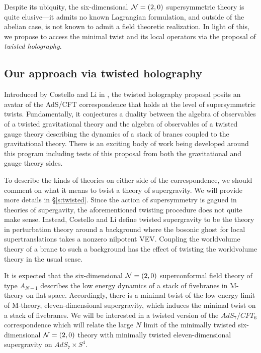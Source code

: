 Despite its ubiquity, the six-dimensional~$\mathcal N=(2,0)$ supersymmetric theory is quite elusive---it admits no known Lagrangian formulation, and outside of the abelian case, is not known to admit a field theoretic realization.
In light of this, we propose to access the minimal twist and its local operators via the proposal of \textit{twisted holography}.

\subsection{Our approach via twisted holography}
Introduced by Costello and Li in \cite{CLsugra}, the twisted holography proposal posits an avatar of the AdS/CFT correspondence that holds at the level of supersymmetric twists.
Fundamentally, it conjectures a duality between the algebra of observables of a twisted gravitational theory and the algebra of observables of a twisted gauge theory describing the dynamics of a stack of branes coupled to the gravitational theory. There is an exciting body of work being developed around this program including tests of this proposal from both the gravitational and gauge theory sides.

To describe the kinds of theories on either side of the correspondence, we should comment on what it means to twist a theory of supergravity. We will provide more details in \S \ref{s:twisted}. Since the action of supersymmetry is gagued in theories of supergavity, the aforementioned twisting procedure does not quite make sense. Instead, Costello and Li define twisted supergravity to be the theory in perturbation theory around a background where the bosonic ghost for local supertranslations takes a nonzero nilpotent VEV. Coupling the worldvolume theory of a brane to such a background has the effect of twisting the worldvolume theory in the usual sense.

It is expected that the six-dimensional $\mathcal N=(2,0)$ superconformal field theory of type $A_{N-1}$ describes the low energy dynamics of a stack of fivebranes in M-theory on flat space. Accordingly, there is a minimal twist of the low energy limit of M-theory, eleven-dimensional supergravity, which induces the minimal twist on a stack of fivebranes. We will be interested in a twisted version of the $AdS_{7}/CFT_{6}$ correspondence which will relate the large $N$ limit of the minimally twisted six-dimensional $\mathcal N=(2,0)$ theory with minimally twisted eleven-dimensional supergravity on $AdS_{7}\times S^{4}$.

